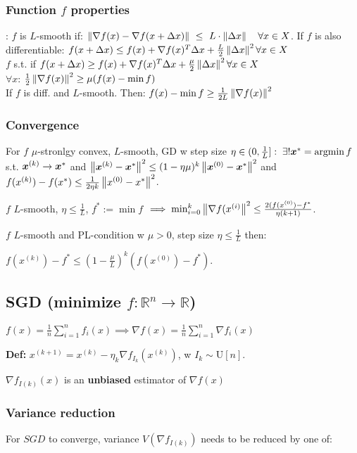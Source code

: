 \subsubsection*{Function $f$ properties}
: $f$ is $L$-smooth if: $\left\lVert\nabla f(x) - \nabla f(x + \Delta x)\right\rVert\ \le\ L \cdot \left\lVert\Delta x\right\rVert\quad \forall x \in X$. If $f$ is also differentiable: $f(x+\Delta x) \le f(x) + \nabla f(x)^T \Delta x + \frac{L}{2}\left\lVert\Delta x\right\rVert^2 \forall x \in X$\\
 $f$ s.t. if $f(x+\Delta x) \ge f(x) + \nabla f(x)^T \Delta x + \frac{\mu}{2}\left\lVert\Delta x\right\rVert^2 \forall x \in X$\\
 $\forall x$: $\frac{1}{2}\left\lVert\nabla f(x)\right\rVert^2 \ge \mu (f(x) - \min f)$\\
 If $f$ is diff. and $L$-smooth. Then: $f(x) - \min f \ge \frac{1}{2L}\left\lVert\nabla f(x)\right\rVert^2$
\subsubsection*{Convergence}
For $f$ $\mu$-stronlgy convex, $L$-smooth, GD w step size $ \eta \in (0,\frac{1}{L}]:\; \exists!\boldsymbol{x}^*=\operatorname*{argmin} f$ s.t. $\boldsymbol{x}^{(k)}\rightarrow \boldsymbol{x}^*$ and
$\left\lVert\boldsymbol{x}^{(k)} - \boldsymbol{x}^*\right\rVert^2 \le (1- \eta \mu )^k \left\lVert\boldsymbol{x}^{(0)} - \boldsymbol{x}^*\right\rVert^2$
and $f(x^{(k)}) - f(x^*) \le \frac{1}{2 \eta k} \left\lVert x^{(0)} - x^*\right\rVert^2$.

 $f$ $L$-smooth, $\eta \le \frac{1}{L}$, $f^*:=\min f$ $\implies \min_{i=0}^k\left\lVert\nabla f(x^{(i)}\right\rVert^2 \le \frac{2(f(x^{(0)}) - f^*}{\eta (k+1)}$.

 $f$ $L$-smooth and PL-condition w $\mu > 0$, step size $\eta \le \frac{1}{L}$ then:

$f(x^{(k)}) - f^* \le \left(1 - \frac{\mu}{L}\right)^k (f(x^{(0)}) - f^*)$.

\subsection*{SGD (minimize $f:\mathbb{R}^n \rightarrow \mathbb{R}$)}
$f(x) = \frac{1}{n}\sum_{i=1}^{n}f_i(x)\implies \nabla f(x) = \frac{1}{n} \sum_{i=1}^{n}\nabla f_i(x)$

\textbf{Def:} $x^{(k+1)} = x^{(k)} - \eta_k \nabla f_{I_k}(x^{(k)})$, w $I_k\sim \text{U}[n]$.

$\nabla f_{I(k)}(x)$ is an \textbf{unbiased} estimator of $\nabla f(x)$

\subsubsection*{Variance reduction} For $SGD$ to converge, variance $V(\nabla f_{I(k)})$ needs to be reduced by one of:

